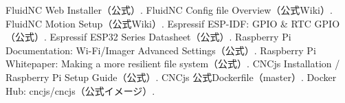 \documentclass[uplatex,dvipdfmx]{ujarticle}
\begin{document}
\begin{thebibliography}{999}
 FluidNC Web Installer（公式）.
 FluidNC Config file Overview（公式Wiki）.
 FluidNC Motion Setup（公式Wiki）.
 Espressif ESP-IDF: GPIO \& RTC GPIO（公式）.
 Espressif ESP32 Series Datasheet（公式）.
 Raspberry Pi Documentation: Wi-Fi/Imager Advanced Settings（公式）.
 Raspberry Pi Whitepaper: Making a more resilient file system（公式）.
 CNCjs Installation / Raspberry Pi Setup Guide（公式）.
 CNCjs 公式Dockerfile（master）.
 Docker Hub: cncjs/cncjs（公式イメージ）.
\end{thebibliography}
\end{document}
